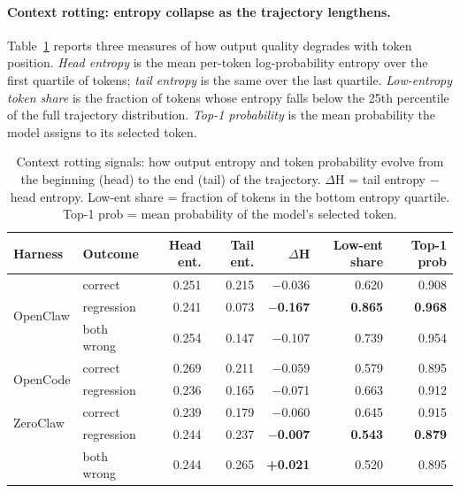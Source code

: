 \paragraph{Context rotting: entropy collapse as the trajectory lengthens.}

Table~\ref{tab:gpqa-context-rotting} reports three measures of how output
quality degrades with token position.
\emph{Head entropy} is the mean per-token log-probability entropy over the first
quartile of tokens; \emph{tail entropy} is the same over the last quartile.
\emph{Low-entropy token share} is the fraction of tokens whose entropy falls
below the 25th percentile of the full trajectory distribution.
\emph{Top-1 probability} is the mean probability the model assigns to its
selected token.

\begin{table}[t]
\centering
\small
\caption{%
  Context rotting signals: how output entropy and token probability evolve
  from the beginning (head) to the end (tail) of the trajectory.
  $\Delta$H = tail entropy $-$ head entropy.
  Low-ent share = fraction of tokens in the bottom entropy quartile.
  Top-1 prob = mean probability of the model's selected token.
}
\label{tab:gpqa-context-rotting}
\setlength{\tabcolsep}{3.5pt}
\begin{tabular}{llrrrrr}
\toprule
Harness & Outcome & Head ent. & Tail ent. & $\Delta$H & Low-ent share & Top-1 prob \\
\midrule
\multirow{3}{*}{OpenClaw}
 & correct   & 0.251 & 0.215 & $-$0.036 & 0.620 & 0.908 \\
 & regression & 0.241 & 0.073 & \textbf{$-$0.167} & \textbf{0.865} & \textbf{0.968} \\
 & both wrong & 0.254 & 0.147 & $-$0.107 & 0.739 & 0.954 \\
\midrule
\multirow{2}{*}{OpenCode}
 & correct   & 0.269 & 0.211 & $-$0.059 & 0.579 & 0.895 \\
 & regression & 0.236 & 0.165 & $-$0.071 & 0.663 & 0.912 \\
\midrule
\multirow{2}{*}{ZeroClaw}
 & correct   & 0.239 & 0.179 & $-$0.060 & 0.645 & 0.915 \\
 & regression & 0.244 & 0.237 & \textbf{$-$0.007} & \textbf{0.543} & \textbf{0.879} \\
 & both wrong & 0.244 & 0.265 & \textbf{+0.021} & 0.520 & 0.895 \\
\bottomrule
\end{tabular}
\end{table}

